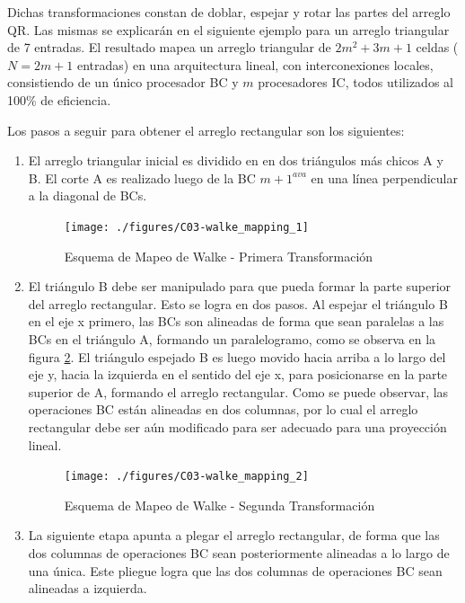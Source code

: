 Dichas transformaciones constan de doblar, espejar y rotar las partes del arreglo QR. Las mismas se explicarán en el siguiente ejemplo para un arreglo triangular de 7 entradas. El resultado mapea un arreglo triangular de $2m^2+3m+1$ celdas ($N=2m+1$ entradas) en una arquitectura lineal, con interconexiones locales, consistiendo de un único procesador BC y $m$ procesadores IC, todos utilizados al 100\% de eficiencia.

Los pasos a seguir para obtener el arreglo rectangular son los siguientes:

\begin{enumerate}
	
	\item El arreglo triangular inicial es dividido en en dos triángulos más chicos A y B. El corte A es realizado luego de la BC $m+1^{ava}$ en una línea perpendicular a la diagonal de BCs.

	\begin{figure}[h!]
        \centering
        \texttt{[image: ./figures/C03-walke\_mapping\_1]}
        \caption{Esquema de Mapeo de Walke - Primera Transformación}
        \label{fig:walke_mapping_1}
	\end{figure}
	
	\item El triángulo B debe ser manipulado para que pueda formar la parte superior del arreglo rectangular. Esto se logra en dos pasos. Al espejar el triángulo B en el eje x primero, las BCs son alineadas de forma que sean paralelas a las BCs en el triángulo A, formando un paralelogramo, como se observa en la figura \ref{fig:walke_mapping_2}. El triángulo espejado B es luego movido hacia arriba a lo largo del eje y, hacia la izquierda en el sentido del eje x, para posicionarse en la parte superior de A, formando el arreglo rectangular. Como se puede observar, las operaciones BC están alineadas en dos columnas, por lo cual el arreglo rectangular debe ser aún modificado para ser adecuado para una proyección lineal.

	\begin{figure}[h!]
        \centering
        \texttt{[image: ./figures/C03-walke\_mapping\_2]}
        \caption{Esquema de Mapeo de Walke - Segunda Transformación}
        \label{fig:walke_mapping_2}
	\end{figure}

	\item La siguiente etapa apunta a plegar el arreglo rectangular, de forma que las dos columnas de operaciones BC sean posteriormente alineadas a lo largo de una única. Este pliegue logra que las dos columnas de operaciones BC sean alineadas a izquierda.


\end{enumerate}

